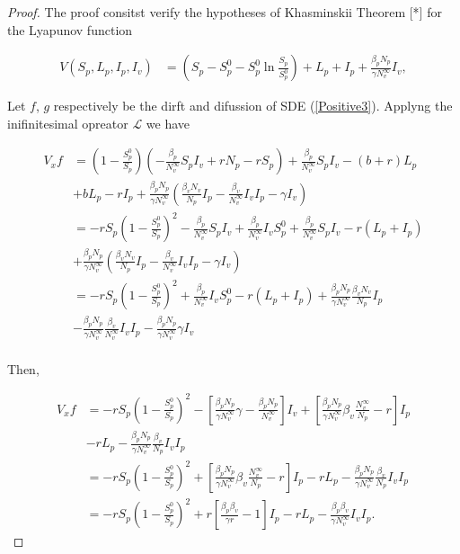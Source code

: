 \begin{proof}
	The proof consitst verify the hypotheses of Khasminskii Theorem [*] for the Lyapunov function
	
	\begin{align*}
		V(S_p,L_p,I_p,I_v) &= 
			\left(S_p-S_p^0-S_p^0\ln\frac{S_p}{S_p^0}\right)+L_p+I_p+\frac{\beta_p N_p}{\gamma N^\infty_v}I_v,
	\end{align*}
	
	Let $f$, $g$ respectively be the dirft and difussion of SDE (\ref{Positive3}).	Applyng the inifinitesimal opreator $\mathcal{L}$ we have
	
	\begin{align*}
		V_x f &=
				\left(1-\frac{S_p^0}{S_p}\right)\left(-\frac{\beta_p}{N^\infty_v}S_pI_v+ rN_p-r S_p\right)+\frac{\beta_p}{N^\infty_v}S_pI_v-(b+r)L_p\\
			  &+
				bL_p-rI_p+\frac{\beta_p N_p}{\gamma N^\infty_v}\left(\frac{\beta_v N_v}{N_p}I_p-\frac{\beta_v}{N_v^\infty}I_vI_p-\gamma I_v\right)\\
			  &=
			  	-rS_p\left(1-\frac{S_p^0}{S_p}\right)^2-\frac{\beta_p}{N_v^\infty}S_pI_v+\frac{\beta_p}{N_v^\infty}I_vS_p^0+\frac{\beta_p}{N_v^\infty}S_pI_v-r(L_p+I_p)\\
			  &+
			  	\frac{\beta_p N_p}{\gamma N^\infty_v}\left(\frac{\beta_v N_v}{N_p}I_p-\frac{\beta_v}{N_v^\infty}I_vI_p-\gamma I_v\right)\\
			  &=
			  	-rS_p\left(1-\frac{S_p^0}{S_p}\right)^2+\frac{\beta_p}{N_v^\infty}I_vS_p^0-r(L_p+I_p)+\frac{\beta_p N_p}{\gamma N^\infty_v}\frac{\beta_v N_v}{N_p}I_p\\
			  &-	
			  	\frac{\beta_p N_p}{\gamma N^\infty_v}\frac{\beta_v}{N_v^\infty}I_vI_p-\frac{\beta_p N_p}{\gamma N^\infty_v}\gamma I_v\\
	\end{align*}
	
	Then,
	
	\begin{align*}
		V_x f &=
				-rS_p\left(1-\frac{S_p^0}{S_p}\right)^2-\left[\frac{\beta_p N_p}{\gamma N^\infty_v}\gamma-\frac{\beta_p N_p}{N_v^\infty}\right]I_v+\left[\frac{\beta_p N_p}{\gamma N^\infty_v}\beta_v\frac{N_v^\infty}{N_p}-r\right]I_p\\
		 	  &-
				rL_p-\frac{\beta_p N_p}{\gamma N^\infty_v}\frac{\beta_v}{N_p}I_vI_p\\
			  &=
			  	-rS_p\left(1-\frac{S_p^0}{S_p}\right)^2 + \left[\frac{\beta_p N_p}{\gamma N^\infty_v}\beta_v\frac{N_v^\infty}{N_p}-r\right]I_p-rL_p-\frac{\beta_p N_p}{\gamma N^\infty_v}\frac{\beta_v}{N_p}I_vI_p\\
			  &=
			  	-rS_p\left(1-\frac{S_p^0}{S_p}\right)^2 + r\left[\frac{\beta_p\beta_v}{\gamma r}-1\right]I_p-rL_p-\frac{\beta_p\beta_v}{\gamma N^\infty_v}I_vI_p.
	\end{align*}
	

\end{proof}
